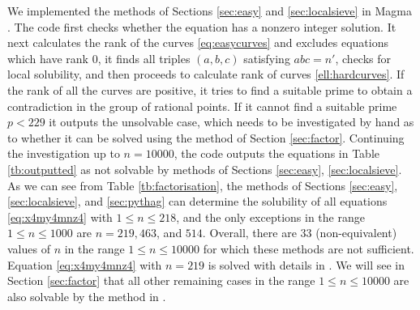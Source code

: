 \documentclass[a4paper,12pt,english,reqno]{amsart}
\begin{document}
We implemented the methods of Sections \ref{sec:easy} and \ref{sec:localsieve} in Magma \cite{MR1484478}. The code first checks whether the equation has a nonzero integer solution. It next calculates the rank of the curves \eqref{eq:easycurves} and excludes equations which have rank $0$, it finds all triples $(a,b,c)$ satisfying $abc=n'$, checks for local solubility, and then proceeds to calculate rank of curves \eqref{ell:hardcurves}. If the rank of all the curves are positive, it tries to find a suitable prime to obtain a contradiction in the group of rational points. If it cannot find a suitable prime $p<229$ it outputs the unsolvable case, which needs to be investigated by hand as to whether it can be solved using the method of Section \ref{sec:factor}.  Continuing the investigation up to $n=10000$, the code outputs the equations in Table \ref{tb:outputted} as not solvable by methods of Sections \ref{sec:easy}, \ref{sec:localsieve}. As we can see from Table \ref{tb:factorisation}, the methods of Sections \ref{sec:easy}, \ref{sec:localsieve}, and \ref{sec:pythag} can determine the solubility of all equations \eqref{eq:x4my4mnz4} with $1\leq n \leq 218$, and the only exceptions in the range $1\leq n \leq 1000$ are $n=219,463$, and $514$. Overall, there are $33$ (non-equivalent) values of $n$ in the range $1\leq n \leq 10000$ for which these methods are not sufficient. Equation \eqref{eq:x4my4mnz4} with $n=219$ is solved with details in \cite{THO2026125764}. We will see in Section \ref{sec:factor} that all other remaining cases in the range $1\leq n \leq 10000$ are also solvable by the method in \cite{THO2026125764}.
\end{document}
